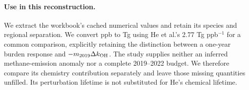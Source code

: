 \documentclass[11pt]{article}
\begin{document}
\paragraph{Use in this reconstruction.} We extract the workbook's cached numerical
values and retain its species and regional separation. We convert ppb to Tg
using He et al.'s 2.77 Tg ppb$^{-1}$ for a common comparison, explicitly retaining
the distinction between a one-year burden response and $-m_{2019}\Delta k_{\rm OH}$.
The study supplies neither an inferred methane-emission anomaly nor a complete
2019--2022 budget. We therefore compare its chemistry contribution separately
and leave those missing quantities unfilled. Its perturbation lifetime is not
substituted for He's chemical lifetime.
\end{document}
